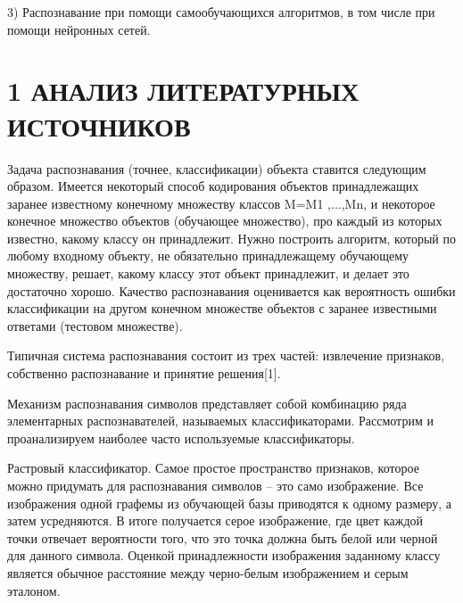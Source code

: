 \documentclass[14pt,a4paper]{extreport}
\begin{document}
\hspace{4ex} 3) Распознавание при помощи самообучающихся алгоритмов, в том числе при помощи нейронных сетей.\





	\newpage
	\section*{\normalsize\hspace{4ex}1 АНАЛИЗ ЛИТЕРАТУРНЫХ ИСТОЧНИКОВ}
	
	 
\hspace{4ex} Задача распознавания (точнее, классификации) объекта ставится следующим образом. Имеется некоторый способ кодирования объектов принадлежащих заранее известному конечному множеству классов M={M1  ,...,Mn}, и некоторое конечное множество объектов (обучающее множество), про каждый из которых известно, какому классу он принадлежит. Нужно построить алгоритм, который по любому входному объекту, не обязательно принадлежащему обучающему множеству, решает, какому классу этот объект принадлежит, и делает это достаточно хорошо. Качество распознавания оценивается как вероятность ошибки классификации на другом конечном множестве объектов с заранее известными ответами (тестовом множестве).\
 
 \hspace{4ex} Типичная система распознавания состоит из трех частей: извлечение признаков, собственно распознавание и принятие решения[1].\
 
\hspace{4ex} Механизм распознавания символов представляет собой комбинацию ряда элементарных распознавателей, называемых классификаторами. Рассмотрим и проанализируем наиболее часто используемые классификаторы.\
      
\hspace{4ex} Растровый классификатор. Самое простое пространство признаков, которое можно придумать для распознавания символов – это само изображение. Все изображения одной графемы из обучающей базы приводятся к одному размеру, а затем усредняются. В итоге получается серое изображение, где цвет каждой точки отвечает вероятности того, что это точка должна быть белой или черной для данного символа. Оценкой принадлежности изображения заданному классу является обычное расстояние между черно-белым изображением и серым эталоном.\
\end{document}
